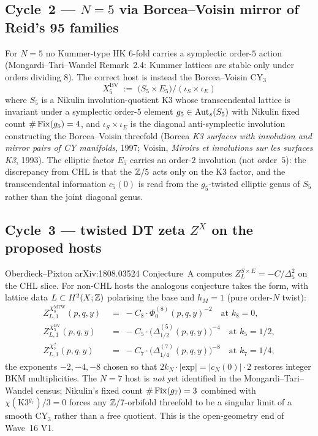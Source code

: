 \subsection*{Cycle~2 --- $N=5$ via Borcea--Voisin mirror of Reid's 95 families}

For $N=5$ no Kummer-type HK $6$-fold carries a symplectic order-$5$
action (Mongardi--Tari--Wandel Remark~2.4: Kummer lattices are
stable only under orders dividing $8$). The correct host is
instead the Borcea--Voisin CY$_3$
\[
  X_{5}^{\mathrm{BV}} \;:=\; \bigl(S_{5}\times E_{5}\bigr)/(\iota_{S}\times \iota_{E})
\]
where $S_{5}$ is a Nikulin involution-quotient K3 whose
transcendental lattice is invariant under a symplectic order-$5$
element $g_{5}\in\mathrm{Aut}_{s}(S_{5})$ with Nikulin fixed count
$\#\,\mathrm{Fix}(g_{5})=4$, and $\iota_{S}\times\iota_{E}$ is the
diagonal anti-symplectic involution constructing the Borcea--Voisin
threefold (Borcea \emph{K3 surfaces with involution and mirror pairs
of CY manifolds}, 1997; Voisin, \emph{Miroirs et involutions sur les
surfaces K3}, 1993). The elliptic factor $E_{5}$ carries an order-$2$
involution (not order~$5$): the discrepancy from CHL is that the
$\mathbb{Z}/5$ acts only on the K3 factor, and the transcendental information
$c_{5}(0)$ is read from the $g_{5}$-twisted elliptic genus of $S_{5}$
rather than the joint diagonal genus.

\subsection*{Cycle~3 --- twisted DT zeta $Z^{X}$ on the proposed hosts}

Oberdieck--Pixton arXiv:1808.03524 Conjecture~A computes
$Z^{S\times E}_{L}=-C/\Delta_{5}^{2}$ on the CHL slice. For
non-CHL hosts the analogous conjecture takes the form, with
lattice data $L\subset H^{2}(X;\mathbb{Z})$ polarising the base and
$h_M=1$ (pure order-$N$ twist):
\begin{align*}
  Z^{X_{8}^{\mathrm{MTW}}}_{L,1}(p,q,y)
  \;&=\; -C_{8}\cdot \Phi_{0}^{(8)}(p,q,y)^{-2}\quad\text{at }k_{8}=0,\\
  Z^{X_{5}^{\mathrm{BV}}}_{L,1}(p,q,y)
  \;&=\; -C_{5}\cdot \bigl(\Delta_{1/2}^{(5)}(p,q,y)\bigr)^{-4}\quad\text{at }k_{5}=1/2,\\
  Z^{X_{7}^{\mathrm{?}}}_{L,1}(p,q,y)
  \;&=\; -C_{7}\cdot \bigl(\Delta_{1/4}^{(7)}(p,q,y)\bigr)^{-8}\quad\text{at }k_{7}=1/4,
\end{align*}
the exponents $-2, -4, -8$ chosen so that $2k_{N}\cdot|\text{exp}|=|c_{N}(0)|\cdot 2$
restores integer BKM multiplicities. The $N=7$ host is \emph{not}
yet identified in the Mongardi--Tari--Wandel census; Nikulin's
fixed count $\#\,\mathrm{Fix}(g_{7})=3$ combined with $\chi(\mathrm{K3}^{g_{7}})/3=0$
forces any $\mathbb{Z}/7$-orbifold threefold to be a singular limit of a
smooth CY$_3$ rather than a free quotient. This is the
open-geometry end of Wave~16 V1.

